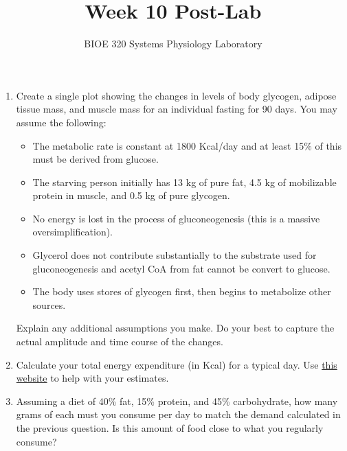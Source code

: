 \documentclass{article}
\title{Week 10 Post-Lab}
\author{BIOE 320 Systems Physiology Laboratory}
\date{}
\begin{document}
\maketitle
\large

\begin{enumerate}
	\item Create a single plot showing the changes in levels of body glycogen, adipose tissue mass, and muscle mass for an individual fasting for 90 days. You may assume the following:\begin{itemize}
		\item The metabolic rate is constant at 1800 Kcal/day and at least 15\% of this must be derived from glucose.
		\item The starving person initially has 13 kg of pure fat, 4.5 kg of mobilizable protein in muscle, and 0.5 kg of pure glycogen.
		\item No energy is lost in the process of gluconeogenesis (this is a massive oversimplification).
		\item Glycerol does not contribute substantially to the substrate used for gluconeogenesis and acetyl CoA from fat cannot be convert to glucose.
		\item The body uses stores of glycogen first, then begins to metabolize other sources. 
	\end{itemize}
	
	Explain any additional assumptions you make. Do your best to capture the actual amplitude and time course of the changes.
	
	\item Calculate your total energy expenditure (in Kcal) for a typical day. Use \href{https://sites.google.com/site/compendiumofphysicalactivities/}{this website} to help with your estimates.
	\item Assuming a diet of 40\% fat, 15\% protein, and 45\% carbohydrate, how many grams of each must you consume per day to match the demand calculated in the previous question. Is this amount of food close to what you regularly consume?
\end{enumerate}
\end{document}

